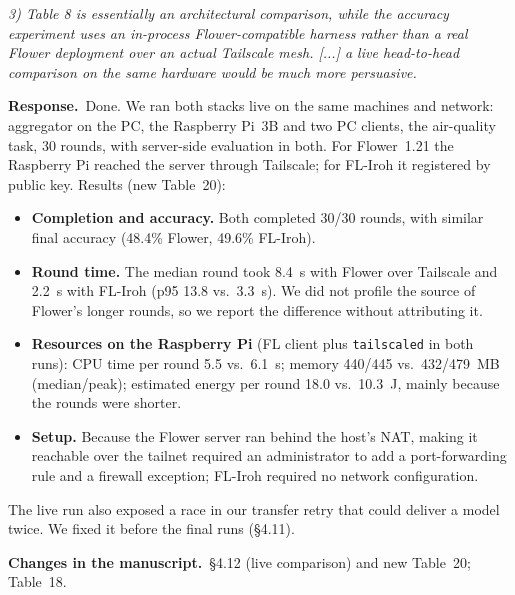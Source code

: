 \documentclass[11pt,a4paper]{article}
\newenvironment{comment}{\par\medskip\noindent\begin{minipage}{\linewidth}\color{blue!45!black}\itshape}{\end{minipage}\par}
\newcommand{\reply}{\par\smallskip\noindent\textbf{Response.}~}
\newcommand{\changes}{\par\smallskip\noindent\textbf{Changes in the manuscript.}~}
\begin{document}
\begin{comment}
3) Table 8 is essentially an architectural comparison, while the accuracy experiment uses an in-process Flower-compatible harness rather than a real Flower deployment over an actual Tailscale mesh. [...] a live head-to-head comparison on the same hardware would be much more persuasive.
\end{comment}
\reply Done. We ran both stacks live on the same machines and network: aggregator on the PC, the Raspberry Pi~3B and two PC clients, the air-quality task, 30 rounds, with server-side evaluation in both. For Flower~1.21 the Raspberry Pi reached the server through Tailscale; for FL-Iroh it registered by public key. Results (new Table~20):
\begin{itemize}[leftmargin=1.3em,itemsep=0.1em]
\item \textbf{Completion and accuracy.} Both completed 30/30 rounds, with similar final accuracy (48.4\% Flower, 49.6\% FL-Iroh).
\item \textbf{Round time.} The median round took 8.4~s with Flower over Tailscale and 2.2~s with FL-Iroh (p95 13.8 vs.\ 3.3~s). We did not profile the source of Flower's longer rounds, so we report the difference without attributing it.
\item \textbf{Resources on the Raspberry Pi} (FL client plus \texttt{tailscaled} in both runs): CPU time per round 5.5 vs.\ 6.1~s; memory 440/445 vs.\ 432/479~MB (median/peak); estimated energy per round 18.0 vs.\ 10.3~J, mainly because the rounds were shorter.
\item \textbf{Setup.} Because the Flower server ran behind the host's NAT, making it reachable over the tailnet required an administrator to add a port-forwarding rule and a firewall exception; FL-Iroh required no network configuration.
\end{itemize}
The live run also exposed a race in our transfer retry that could deliver a model twice. We fixed it before the final runs (\S4.11).

\changes \S4.12 (live comparison) and new Table~20; Table~18.
\end{document}
